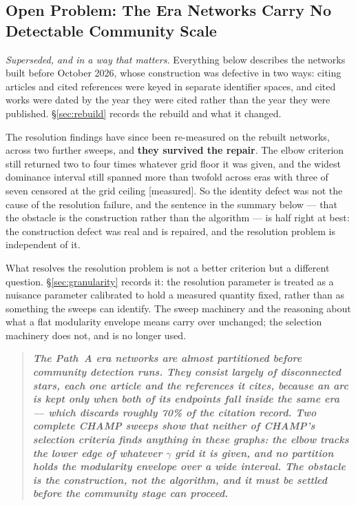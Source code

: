 \documentclass[11pt]{article}
\newcommand{\meas}{{\footnotesize\textsf{[measured]}}}
\begin{document}

\subsection{Open Problem: The Era Networks Carry No Detectable Community Scale}
\label{sec:scalefinding}
\label{sec:starfinding}

\emph{Superseded, and in a way that matters.} Everything below describes the networks built
before October 2026, whose construction was defective in two ways: citing articles and cited
references were keyed in separate identifier spaces, and cited works were dated by the year
they were cited rather than the year they were published. \S\ref{sec:rebuild} records the
rebuild and what it changed.

The resolution findings have since been re-measured on the rebuilt networks, across two
further sweeps, and \textbf{they survived the repair}. The elbow criterion still returned two
to four times whatever grid floor it was given, and the widest dominance interval still
spanned more than twofold across eras with three of seven censored at the grid ceiling
\meas{}. So the identity defect was not the cause of the resolution failure, and the sentence
in the summary below --- that the obstacle is the construction rather than the algorithm ---
is half right at best: the construction defect was real and is repaired, and the resolution
problem is independent of it.

What resolves the resolution problem is not a better criterion but a different question.
\S\ref{sec:granularity} records it: the resolution parameter is treated as a nuisance
parameter calibrated to hold a measured quantity fixed, rather than as something the sweeps
can identify. The sweep machinery and the reasoning about what a flat modularity envelope
means carry over unchanged; the selection machinery does not, and is no longer used.

\begin{quote}
	\textbf{\itshape The Path~A era networks are almost partitioned before community detection
	runs. They consist largely of disconnected stars, each one article and the references it
	cites, because an arc is kept only when both of its endpoints fall inside the same era ---
	which discards roughly 70\% of the citation record. Two complete CHAMP sweeps show that
	neither of CHAMP's selection criteria finds anything in these graphs: the elbow tracks the
	lower edge of whatever $\gamma$ grid it is given, and no partition holds the modularity
	envelope over a wide interval. The obstacle is the construction, not the algorithm, and it
	must be settled before the community stage can proceed.}
\end{quote}
\end{document}

